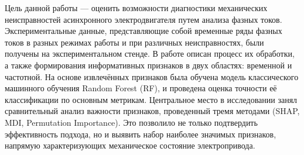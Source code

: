 Цель данной работы — оценить возможности диагностики механических неисправностей асинхронного электродвигателя путем анализа фазных токов. Экспериментальные данные, представляющие собой временные ряды фазных токов в разных режимах работы и при различных неисправностях, были получены на экспериментальном стенде. В работе описан процесс их обработки, а также формирования информативных признаков в двух областях: временной и частотной. На основе извлечённых признаков была обучена модель классического машинного обучения Random Forest (RF), и проведена оценка точности её классификации по основным метрикам. Центральное место в исследовании занял сравнительный анализ важности признаков, проведенный тремя методами (SHAP, MDI, Permutation Importance). Это позволило не только подтвердить эффективность подхода, но и выявить набор наиболее значимых признаков, напрямую характеризующих механическое состояние электропривода.





